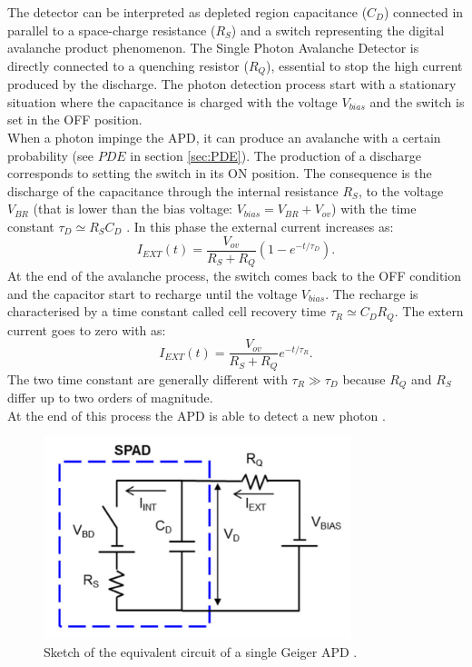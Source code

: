 The detector can be interpreted as depleted region capacitance ($C_D$) connected in parallel to a space-charge resistance ($R_S$) and a switch representing the digital avalanche product phenomenon. The Single Photon Avalanche Detector is directly connected to a quenching resistor ($R_Q$), essential to stop the high current produced by the discharge. The photon detection process start with a stationary situation where the capacitance is charged with the voltage $V_{bias}$ and the switch is set in the OFF position.\\
When a photon impinge the APD, it can produce an avalanche with a certain probability (see $PDE$ in section \ref{sec:PDE}). The production of a discharge corresponds to setting the switch in its ON position. The consequence is the discharge of the capacitance through the internal resistance $R_S$, to the voltage $V_{BR}$ (that is lower than the bias voltage: $V_{bias} = V_{BR} + V_{ov}$) with the time constant $\tau_D \simeq R_S C_D$ \cite{electrics}. In this phase the external current increases as:
\begin{equation}
    I_{EXT}(t) = \frac{V_{ov}}{R_S + R_Q}\left( 1 - e^{-t/\tau_D} \right).
\end{equation}
At the end of the avalanche process, the switch comes back to the OFF condition and the capacitor start to recharge until the voltage $V_{bias}$. 
The recharge is characterised by a time constant called cell recovery time $\tau_R \simeq C_D R_Q$. The extern current goes to zero with as:
\begin{equation}
    I_{EXT}(t) = \frac{V_{ov}}{R_S + R_Q}e^{-t/\tau_R}.
\end{equation}
The two time constant are generally different with $\tau_R \gg \tau_D$ because $R_Q$ and $R_S$ differ up to two orders of magnitude.\\
At the end of this process the APD is able to detect a new photon \cite{APD_new_ph}.\\

\begin{figure}
	\centering
	\includegraphics[width=0.8\textwidth]{IMG/Cap3/APD_model.png}
	\caption{Sketch of the equivalent circuit of a single Geiger APD \cite{electrics}.}
	\label{fig:APD_model}
\end{figure}

